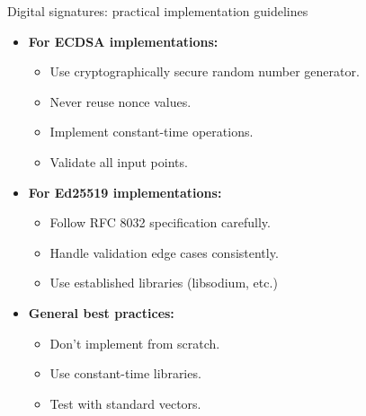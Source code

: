 \documentclass[aspectratio=169, lualatex, handout]{beamer}
\begin{document}
\begin{frame}{Digital signatures: practical implementation guidelines}
	\begin{itemize}
		\item \textbf{For ECDSA implementations:}
		      \begin{itemize}
			      \item Use cryptographically secure random number generator.
			      \item Never reuse nonce values.
			      \item Implement constant-time operations.
			      \item Validate all input points.
		      \end{itemize}
		\item \textbf{For Ed25519 implementations:}
		      \begin{itemize}
			      \item Follow RFC 8032 specification carefully.
			      \item Handle validation edge cases consistently.
			      \item Use established libraries (libsodium, etc.)
		      \end{itemize}
		\item \textbf{General best practices:}
		      \begin{itemize}
			      \item Don't implement from scratch.
			      \item Use constant-time libraries.
			      \item Test with standard vectors.
		      \end{itemize}
	\end{itemize}
\end{frame}
\end{document}
